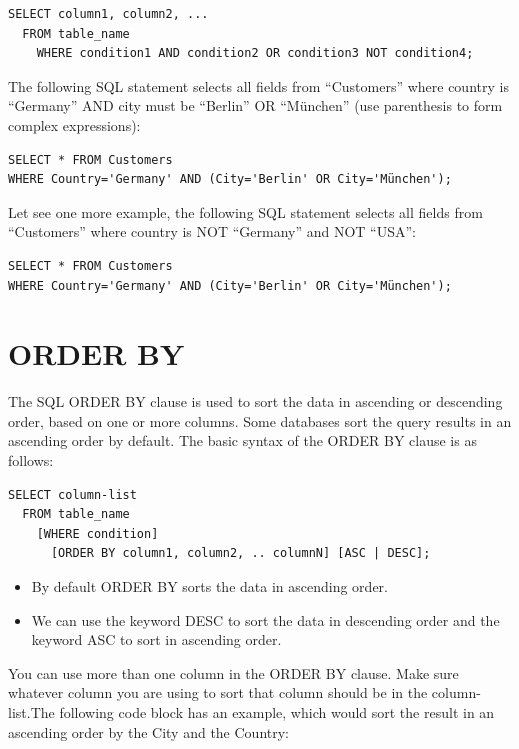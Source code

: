 \documentclass[
]{book}
\providecommand{\tightlist}{%
  \setlength{\itemsep}{0pt}\setlength{\parskip}{0pt}}
\begin{document}
\begin{verbatim}
SELECT column1, column2, ...
  FROM table_name
    WHERE condition1 AND condition2 OR condition3 NOT condition4;
\end{verbatim}

The following SQL statement selects all fields from ``Customers'' where country is ``Germany'' AND city must be ``Berlin'' OR ``München'' (use parenthesis to form complex expressions):

\begin{verbatim}
SELECT * FROM Customers
WHERE Country='Germany' AND (City='Berlin' OR City='München');
\end{verbatim}

Let see one more example, the following SQL statement selects all fields from ``Customers'' where country is NOT ``Germany'' and NOT ``USA'':

\begin{verbatim}
SELECT * FROM Customers
WHERE Country='Germany' AND (City='Berlin' OR City='München');
\end{verbatim}

\hypertarget{order-by}{%
\section{ORDER BY}\label{order-by}}

The SQL ORDER BY clause is used to sort the data in ascending or descending order, based on one or more columns. Some databases sort the query results in an ascending order by default. The basic syntax of the ORDER BY clause is as follows:

\begin{verbatim}
SELECT column-list 
  FROM table_name 
    [WHERE condition] 
      [ORDER BY column1, column2, .. columnN] [ASC | DESC];
\end{verbatim}

\begin{itemize}
\tightlist
\item
  By default ORDER BY sorts the data in ascending order.
\item
  We can use the keyword DESC to sort the data in descending order and the keyword ASC to sort in ascending order.
\end{itemize}

You can use more than one column in the ORDER BY clause. Make sure whatever column you are using to sort that column should be in the column-list.The following code block has an example, which would sort the result in an ascending order by the City and the Country:
\end{document}
